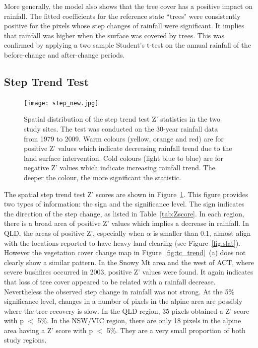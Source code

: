 \documentclass[draft,linenumbers]{agujournal}
\begin{document}
\begin{article}
More generally, the model also shows that the tree cover has a positive impact on rainfall. The fitted coefficients for the reference state ``trees" were consistently positive for the pixels whose step changes of rainfall were significant. It implies that rainfall was higher when the surface was covered by trees. This was confirmed by applying a two sample Student's t-test on the annual rainfall of the before-change and after-change periods. %

\subsection{Step Trend Test}

\begin{figure}[hpt]
  \centering
 \texttt{[image: step\_new.jpg]}
  \caption{Spatial distribution of the step trend test Z' statistics in the two study sites. The test was conducted on the 30-year rainfall data from 1979 to 2009. Warm colours (yellow, orange and red) are for positive Z' values which indicate decreasing rainfall trend due to the land surface intervention. Cold colours (light blue to blue) are for negative Z' values which indicate increasing rainfall trend. The deeper the colour, the more significant the statistic.}
  \label{fig:steptest30}
\end{figure}

The spatial step trend test Z' scores are shown in Figure~\ref{fig:steptest30}. This figure provides two types of information: the sign and the significance level. The sign indicates the direction of the step change, as listed in Table~\ref{tab:Zscore}. In each region, there is a broad area of positive Z' values which implies a decrease in rainfall. In QLD, the areas of positive Z', especially when $\alpha$ is smaller than 0.1, almost align with the locations reported to have heavy land clearing (see Figure~\ref{fig:slat}). However the vegetation cover change map in Figure~\ref{fig:tc_trend}~(a) does not clearly show a similar pattern. In the Snowy Mt area and the west of ACT, where severe bushfires occurred in 2003, positive Z' values were found. It again indicates that loss of tree cover appeared to be related with a rainfall decrease. Nevertheless the observed step change in rainfall was not strong. At the 5\% significance level, changes in a number of pixels in the alpine area are possibly where the tree recovery is slow. In the QLD region, 35 pixels obtained a Z' score with p $<$ 5\%. In the NSW/VIC region, there are only 18 pixels in the alpine area having a Z' score with p $<$ 5\%. They are a very small proportion of both study regions.


\end{article}
\end{document}
